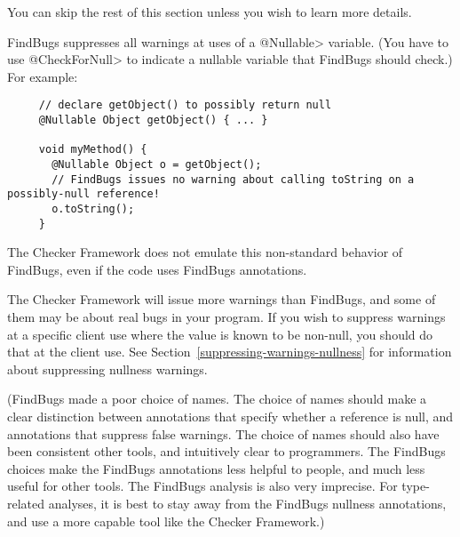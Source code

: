 You can skip the rest of this section unless you wish to learn more details.

FindBugs suppresses all warnings at uses of a \<@Nullable> variable.  
(You have to use \<@CheckForNull> to
indicate a nullable variable that FindBugs should check.)  For example:

\begin{Verbatim}
     // declare getObject() to possibly return null
     @Nullable Object getObject() { ... }

     void myMethod() {
       @Nullable Object o = getObject();
       // FindBugs issues no warning about calling toString on a possibly-null reference!
       o.toString();
     }
\end{Verbatim}

\noindent
The Checker Framework does not emulate this non-standard behavior of
FindBugs, even if the code uses FindBugs annotations.

The Checker Framework will issue more warnings than FindBugs, and some of
them may be about real bugs in your program.
If you wish to suppress warnings at a
specific client use where the value is known to be non-null, you should do that
at the client use.  
See Section~\ref{suppressing-warnings-nullness} for information about
suppressing nullness warnings.

(FindBugs made a poor choice of names.  The choice of names should make a
clear distinction between annotations that specify whether a reference is
null, and annotations that suppress false warnings.  The choice of names
should also have been consistent other tools, and intuitively clear to
programmers.  The FindBugs choices make the FindBugs annotations less
helpful to people, and much less useful for other tools.  The FindBugs
analysis is also very imprecise.  For type-related analyses, it is best to
stay away from the FindBugs nullness annotations, and use a more capable
tool like the Checker Framework.)



